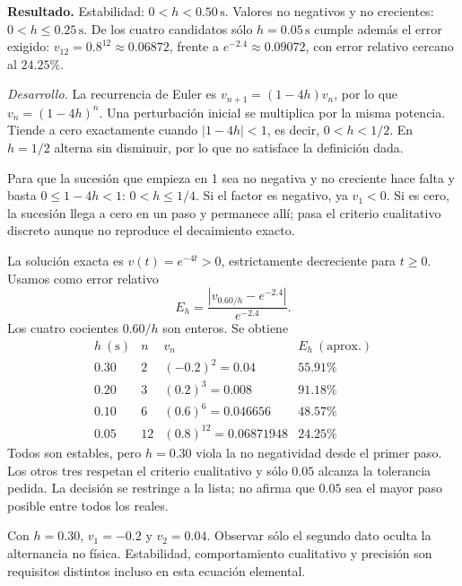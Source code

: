 \noindent\textbf{Resultado.} Estabilidad: \(0<h<0.50\,\mathrm s\). Valores no negativos y no crecientes: \(0<h\le0.25\,\mathrm s\). De los cuatro candidatos sólo \(h=0.05\,\mathrm s\) cumple además el error exigido: \(v_{12}=0.8^{12}\approx0.06872\), frente a \(e^{-2.4}\approx0.09072\), con error relativo cercano al \(24.25\%\).

\noindent\textit{Desarrollo.} La recurrencia de Euler es \(v_{n+1}=(1-4h)v_n\), por lo que \(v_n=(1-4h)^n\). Una perturbación inicial se multiplica por la misma potencia. Tiende a cero exactamente cuando \(|1-4h|<1\), es decir, \(0<h<1/2\). En \(h=1/2\) alterna sin disminuir, por lo que no satisface la definición dada.

Para que la sucesión que empieza en 1 sea no negativa y no creciente hace falta y basta \(0\le1-4h<1\): \(0<h\le1/4\). Si el factor es negativo, ya \(v_1<0\). Si es cero, la sucesión llega a cero en un paso y permanece allí; pasa el criterio cualitativo discreto aunque no reproduce el decaimiento exacto.

La solución exacta es \(v(t)=e^{-4t}>0\), estrictamente decreciente para \(t\ge0\). Usamos como error relativo
\[
E_h=\frac{|v_{0.60/h}-e^{-2.4}|}{e^{-2.4}}.
\]
Los cuatro cocientes \(0.60/h\) son enteros. Se obtiene
\[
\begin{array}{c|c|c|c}
h\ (\mathrm s)&n&v_n&E_h\ (\text{aprox.})\\\hline
0.30&2&(-0.2)^2=0.04&55.91\%\\
0.20&3&(0.2)^3=0.008&91.18\%\\
0.10&6&(0.6)^6=0.046656&48.57\%\\
0.05&12&(0.8)^{12}=0.06871948&24.25\%
\end{array}
\]
Todos son estables, pero \(h=0.30\) viola la no negatividad desde el primer paso. Los otros tres respetan el criterio cualitativo y sólo \(0.05\) alcanza la tolerancia pedida. La decisión se restringe a la lista; no afirma que \(0.05\) sea el mayor paso posible entre todos los reales.

Con \(h=0.30\), \(v_1=-0.2\) y \(v_2=0.04\). Observar sólo el segundo dato oculta la alternancia no física. Estabilidad, comportamiento cualitativo y precisión son requisitos distintos incluso en esta ecuación elemental.
